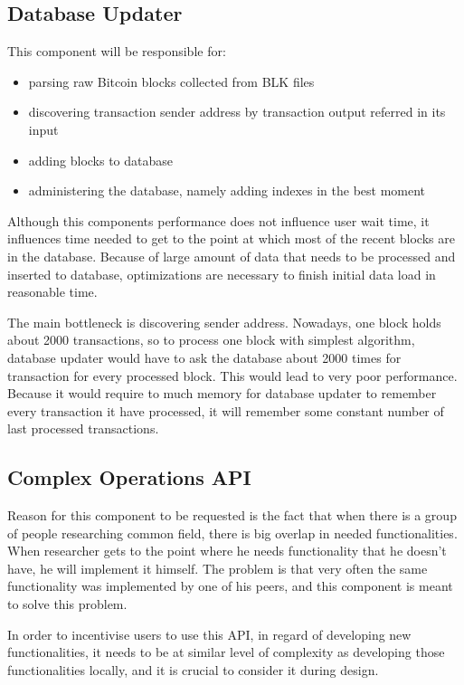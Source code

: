 \documentclass[12pt, en, eng, oneside, final]{mgr}
\begin{document}
\subsection{Database Updater}
This component will be responsible for:

\begin{itemize}
\item
parsing raw Bitcoin blocks collected from BLK files
\item
discovering transaction sender address by transaction output referred in its input
\item
adding blocks to database
\item
administering the database, namely adding indexes in the best moment
\end{itemize}

Although this components performance does not influence user wait time, it influences time needed to get to the point at which most of the recent blocks are in the database. Because of large amount of data that needs to be processed and inserted to database, optimizations are necessary to finish initial data load in reasonable time.

The main bottleneck is discovering sender address. Nowadays, one block holds about 2000 transactions, so to process one block with simplest algorithm, database updater would have to ask the database about 2000 times for transaction for every processed block. This would lead to very poor performance. Because it would require to much memory for database updater to remember every transaction it have processed, it will remember some constant number of last processed transactions.

\subsection{Complex Operations API}
Reason for this component to be requested is the fact that when there is a group of people researching common field, there is big overlap in needed functionalities. When researcher gets to the point where he needs functionality that he doesn't have, he will implement it himself. The problem is that very often the same functionality was implemented by one of his peers, and this component is meant to solve this problem. 

In order to incentivise users to use this API, in regard of developing new functionalities, it needs to be at similar level of complexity as developing those functionalities locally, and it is crucial to consider it during design.
\end{document}
